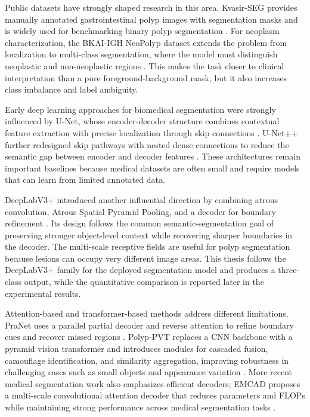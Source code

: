 Public datasets have strongly shaped research in this area. Kvasir-SEG provides manually annotated gastrointestinal polyp images with segmentation masks and is widely used for benchmarking binary polyp segmentation \cite{kvasir_seg}. For neoplasm characterization, the BKAI-IGH NeoPolyp dataset extends the problem from localization to multi-class segmentation, where the model must distinguish neoplastic and non-neoplastic regions \cite{bkai_neopolyp_dataset}. This makes the task closer to clinical interpretation than a pure foreground-background mask, but it also increases class imbalance and label ambiguity.

Early deep learning approaches for biomedical segmentation were strongly influenced by U-Net, whose encoder-decoder structure combines contextual feature extraction with precise localization through skip connections \cite{unet}. U-Net++ further redesigned skip pathways with nested dense connections to reduce the semantic gap between encoder and decoder features \cite{unetpp}. These architectures remain important baselines because medical datasets are often small and require models that can learn from limited annotated data.

DeepLabV3+ introduced another influential direction by combining atrous convolution, Atrous Spatial Pyramid Pooling, and a decoder for boundary refinement \cite{deeplabv3plus}. Its design follows the common semantic-segmentation goal of preserving stronger object-level context while recovering sharper boundaries in the decoder. The multi-scale receptive fields are useful for polyp segmentation because lesions can occupy very different image areas. This thesis follows the DeepLabV3+ family for the deployed segmentation model and produces a three-class output, while the quantitative comparison is reported later in the experimental results.

Attention-based and transformer-based methods address different limitations. PraNet uses a parallel partial decoder and reverse attention to refine boundary cues and recover missed regions \cite{pranet}. Polyp-PVT replaces a CNN backbone with a pyramid vision transformer and introduces modules for cascaded fusion, camouflage identification, and similarity aggregation, improving robustness in challenging cases such as small objects and appearance variation \cite{polyp_pvt}. More recent medical segmentation work also emphasizes efficient decoders; EMCAD proposes a multi-scale convolutional attention decoder that reduces parameters and FLOPs while maintaining strong performance across medical segmentation tasks \cite{emcad}.

